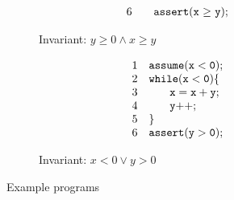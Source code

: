 \begin{figure}[t]
\begin{subfigure}{0.5\textwidth}
\[\begin{array}{ll}
6 & \code{~~~assert(x~{\geq}~y);}
\end{array}
\]
    \caption{Invariant: $y \geq 0 \land x \geq y$}
  \end{subfigure}%
   \begin{subfigure}{0.5\textwidth}
     \vspace{0.3cm}
      \[
      \begin{array}{ll}
      1 & \code{assume(x < 0);} \\
      2 & \code{while(x < 0)\{}  \\
      3 & \code{~~~ \quad x = x + y;}  \\
      4 & \code{~~~ \quad y{++};}  \\
      5 & \code{\}} \\
      6 & \code{assert(y > 0);}
      \end{array}
    \]
    \caption{Invariant: $x < 0 \lor y > 0$}
   \end{subfigure}
\caption{Example programs}
\label{fig:running:example}
\end{figure}

